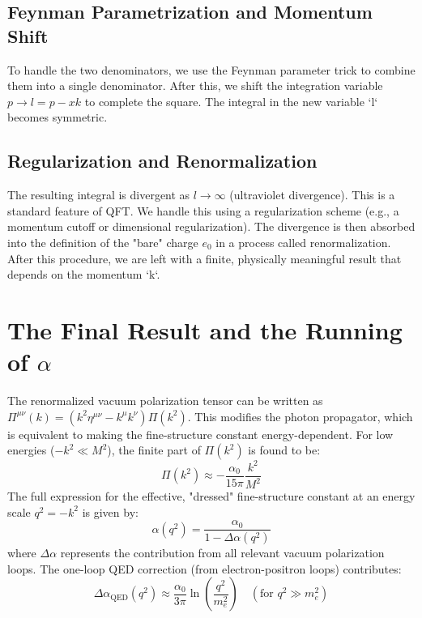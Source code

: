 \documentclass[12pt, a4paper]{article}
\begin{document}
\subsection{Feynman Parametrization and Momentum Shift}
To handle the two denominators, we use the Feynman parameter trick to combine them into a single denominator. After this, we shift the integration variable \( p \to l = p - xk \) to complete the square. The integral in the new variable `l` becomes symmetric.

\subsection{Regularization and Renormalization}
The resulting integral is divergent as \( l \to \infty \) (ultraviolet divergence). This is a standard feature of QFT. We handle this using a regularization scheme (e.g., a momentum cutoff or dimensional regularization). The divergence is then absorbed into the definition of the "bare" charge \( e_0 \) in a process called renormalization. After this procedure, we are left with a finite, physically meaningful result that depends on the momentum `k`.

\section{The Final Result and the Running of \(\alpha\)}
The renormalized vacuum polarization tensor can be written as \( \Pi^{\mu\nu}(k) = (k^2 \eta^{\mu\nu} - k^\mu k^\nu) \Pi(k^2) \). This modifies the photon propagator, which is equivalent to making the fine-structure constant energy-dependent. For low energies (\( -k^2 \ll M^2 \)), the finite part of \( \Pi(k^2) \) is found to be:
\begin{equation}
    \Pi(k^2) \approx -\frac{\alpha_0}{15\pi} \frac{k^2}{M^2}
\end{equation}
The full expression for the effective, "dressed" fine-structure constant at an energy scale \( q^2 = -k^2 \) is given by:
\begin{equation}
    \alpha(q^2) = \frac{\alpha_0}{1 - \Delta\alpha(q^2)}
\end{equation}
where \( \Delta\alpha \) represents the contribution from all relevant vacuum polarization loops. The one-loop QED correction (from electron-positron loops) contributes:
\begin{equation}
    \Delta\alpha_{\text{QED}}(q^2) \approx \frac{\alpha_0}{3\pi} \ln\left(\frac{q^2}{m_e^2}\right) \quad (\text{for } q^2 \gg m_e^2)
\end{equation}
\end{document}
